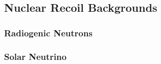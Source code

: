 \subsection{Nuclear Recoil Backgrounds}

\subsubsection{Radiogenic Neutrons}

\subsubsection{Solar Neutrino}
$\ $

